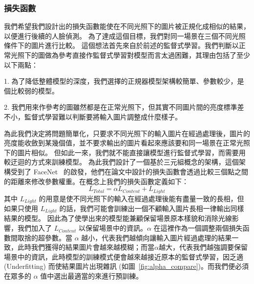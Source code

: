 \subsubsection{損失函數}

我們希望我們設計出的損失函數能使在不同光照下的圖片被正規化成相似的結果，以便進行後續的人臉偵測。
為了達成這個目標，我們對同一場景在三個不同光照條件下的圖片進行比較。
這個想法首先來自於前述的監督式學習。我們判斷以正常光照下的圖做為參考直接作監督式學習對模型而言太過困難，其理由包括了至少以下兩點：

1. 為了降低整體模型的深度，我們選擇的正規器模型架構較簡單、參數較少，是個比較弱的模型。

2. 我們用來作參考的圖雖然都是在正常光照下，但其實不同圖片間的亮度標準差不小，監督式學習難以判斷要將輸入圖片調整成什麼樣子。

為此我們決定將問題簡單化，只要求不同光照下的輸入圖片在經過處理後，圖片的亮度能收斂到某幾個值，並不要求輸出的圖片看起來應該要和同一場景在正常光照下的圖片相似。
但如此一來，我們就不能直接讓模型進行監督式學習，而需要用較迂迴的方式來訓練模型。
為此我們設計了一個基於三元組概念的架構，這個架構受到了 FaceNet~\cite{schroff2015facenet} 的啟發，他們在論文中設計的損失函數會透過比較三個點之間的距離來修改參數權重。在概念上我們的損失函數定義如下：
$$L_{Total} = \alpha L_{Content} + L_{Light}$$
其中 $L_{Light}$ 的用意是使不同光照下的輸入在經過處理後能有盡量一致的長相，但如果只使用 $L_{Light}$ 的話，我們可能會訓練出一個不顧輸入圖片長相一律輸出同樣結果的模型。
因此為了使學出來的模型能兼顧保留場景原本樣貌和消除光線影響，我們加入了 $L_{Content}$ 以保留場景中的資訊。$\alpha$ 在這裡作為一個調整兩個損失函數間取捨的超參數。當 $\alpha$ 越小，代表我們越傾向讓輸入圖片經過處理的結果一致，此時我們獲得的結果圖片會越來越模糊；而當$\alpha$越大，代表我們越強調要保留場景中的資訊，此時模型的訓練模式便會越來越接近原本的監督式學習，因乏適 (Underfitting) 而使結果圖片出現雜訊 (如圖~\ref{fig:alpha_compare})。而我們便必須在眾多的 $\alpha$ 值中選出最適當的來進行預訓練。


